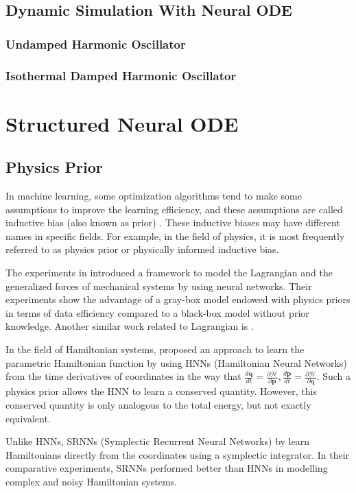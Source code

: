 \documentclass[
	parskip, 			   %
	twoside, 			   %
	DIV=14, 			   %
	BCOR=15.0mm, 		   %
	headsepline, 		   %
	open=right, 		   %
	captions=tableheading, %
	bibliography=totoc,    %
	numbers=noenddot       %
]{scrreprt}
\begin{document}
\section{Dynamic Simulation With Neural ODE}
\subsection{Undamped Harmonic Oscillator}
\subsection{Isothermal Damped Harmonic Oscillator}


\clearpage
\chapter{Structured Neural ODE}
\section{Physics Prior}
In machine learning, some optimization algorithms tend to make some assumptions to improve the learning efficiency, and these assumptions are called inductive bias (also known as prior) \cite{mitchell1997machine}. These inductive biases may have different names in specific fields. For example, in the field of physics, it is most frequently referred to as physics prior or physically informed inductive bias.

The experiments in \cite{gupta2019general} introduced a framework to model the Lagrangian and the generalized forces of mechanical systems by using neural networks. Their experiments show the advantage of a gray-box model endowed with physics priors in terms of data efficiency compared to a black-box model without prior knowledge. Another similar work related to Lagrangian is \cite{lutter2019deep}.

In the field of Hamiltonian systems, \cite{greydanus2019hamiltonian} proposed an approach to learn the parametric Hamiltonian function by using HNNs (Hamiltonian Neural Networks) from the time derivatives of coordinates in the way that $\frac{d\mathbf{q}}{dt} = \frac{\partial \mathcal{H}}{\partial \mathbf{p}}, \frac{d\mathbf{p}}{dt} = \frac{\partial \mathcal{H}}{\partial \mathbf{q}}$. Such a physics prior allows the HNN to learn a conserved quantity. However, this conserved quantity is only analogous to the total energy, but not exactly equivalent.

Unlike HNNs, SRNNs (Symplectic Recurrent Neural Networks) by \cite{chen2019symplectic} learn Hamiltonians directly from the coordinates using a symplectic integrator. In their comparative experiments, SRNNs performed better than HNNs in modelling complex and noisy Hamiltonian systems.
\end{document}
